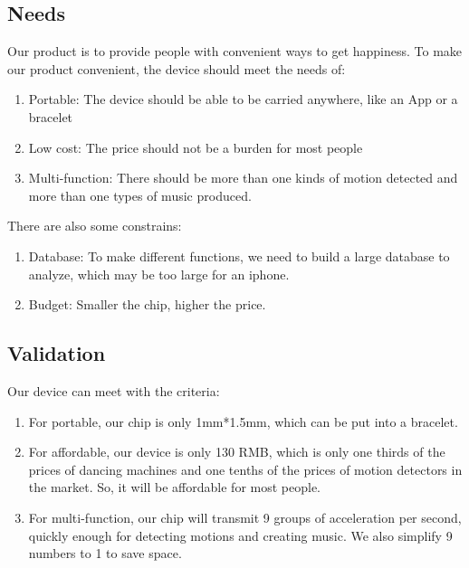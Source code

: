 \documentclass{article}
\begin{document}
\subsection{Needs}
\hspace*{2em}Our product is to provide people with convenient ways to get happiness.
\hspace*{2em}To make our product convenient, the device should meet the needs of:
\begin{enumerate}[\hspace*{3em}(1)]
\item Portable: The device should be able to be carried anywhere, like an App or a bracelet
\item Low cost: The price should not be a burden for most people
\item Multi-function: There should be more than one kinds of motion detected and more than one types of music produced.
\end{enumerate}
\hspace*{2em}There are also some constrains:
\begin{enumerate}[\hspace*{3em}(1)]
\item Database: To make different functions, we need to build a large database to analyze, which may be too large for an iphone.
\item Budget: Smaller the chip, higher the price.
\end{enumerate}
\subsection{Validation}
\hspace*{2em}Our device can meet with the criteria:
\begin{enumerate}[\hspace*{3em}(1)]
\item For portable, our chip is only 1mm*1.5mm, which can be put into a bracelet.
\item For affordable, our device is only 130 RMB, which is only one thirds of the prices of dancing machines and one tenths of the prices of motion detectors in the market.  So, it will be affordable for most people. 
\item For multi-function, our chip will transmit 9 groups of acceleration per second, quickly enough for detecting motions and creating music. We also simplify 9 numbers to 1 to save space.
\end{enumerate}
\end{document}

